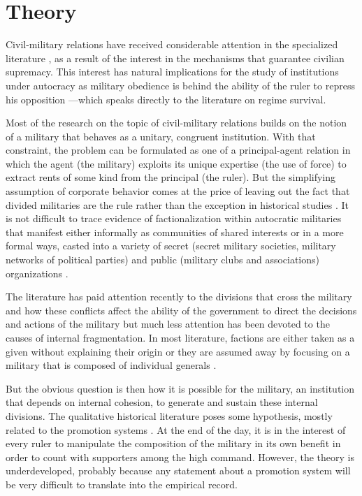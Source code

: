 \section{Theory}

Civil-military relations have received considerable attention in the specialized
literature \citep{acemoglu:2010,besley:2010,leon:2009}, as a result of the
interest in the mechanisms that guarantee civilian supremacy. This interest has
natural implications for the study of institutions under autocracy
\citep{svolik:2012} as military obedience is behind the ability of the ruler to
repress his opposition ---which speaks directly to the literature on regime
survival.

Most of the research on the topic of civil-military relations builds on the
notion of a military that behaves as a unitary, congruent institution. With that
constraint, the problem can be formulated as one of a principal-agent relation
in which the agent (the military) exploits its unique expertise (the use of
force) to extract rents of some kind from the principal (the ruler). But the
simplifying assumption of corporate behavior comes at the price of leaving out
the fact that divided militaries are the rule rather than the exception in
historical studies
\citep[see][]{tiruneh:1993,mailer:2012,devlin:1976,sanchez:2002,acosta:2007,smallman:2002}.
It is not difficult to trace evidence of factionalization within autocratic
militaries that manifest either informally as communities of shared interests or
in a more formal ways, casted into a variety of secret (secret military
societies, military networks of political parties) and public (military clubs
and associations) organizations
\citep{smallman:2002,potash:1969,potash:1980,potash:1994}.

The literature has paid attention recently to the divisions that cross the
military and how these conflicts affect the ability of the government to direct
the decisions and actions of the military \citep{tyson:2012, rivero:2011c,
  eynde:2011} but much less attention has been devoted to the causes of internal
fragmentation. In most literature, factions are either taken as a given without
explaining their origin \citep{rivero:2011c} or they are assumed away by
focusing on a military that is composed of individual generals
\citep{tyson:2012}.

But the obvious question is then how it is possible for the military, an
institution that depends on internal cohesion, to generate and sustain these
internal divisions. The qualitative historical literature poses some hypothesis,
mostly related to the promotion systems \citep{huntington:1957}. At the end of
the day, it is in the interest of every ruler to manipulate the composition of
the military in its own benefit in order to count with supporters among the high
command. However, the theory is underdeveloped, probably because any statement
about a promotion system will be very difficult to translate into the empirical
record. 

